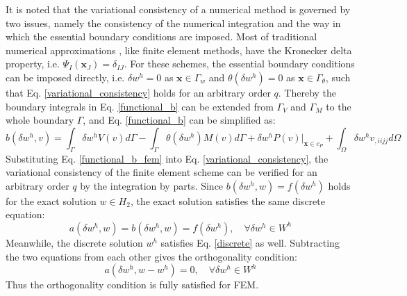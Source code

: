 It is noted that the variational consistency of a numerical method is governed by two issues, namely the consistency of the numerical integration and the way in which the essential boundary conditions are imposed.
Most of traditional numerical approximations \cite{}, like finite element methods, have the Kronecker delta property, i.e. $\Psi_I(\boldsymbol x_J) = \delta_{IJ}$.
For these schemes, the essential boundary conditions can be imposed directly, i.e. $\delta w^h=0$ as $\boldsymbol x \in \Gamma_w$ and $\theta(\delta w^h)=0$ as $\boldsymbol x \in \Gamma_{\theta}$, such that Eq. \eqref{variational_consistency} holds for an arbitrary order $q$.
Thereby the boundary integrals in Eq. \eqref{functional_b} can be extended from $\Gamma_{V}$ and $\Gamma_{M}$ to the whole boundary $\Gamma$, and Eq. \eqref{functional_b} can be simplified as:
\begin{equation}\label{functional_b_fem}
	b(\delta w^h, v) =
	\int_{\Gamma} \delta w^h V(v) d\Gamma
	- \int_{\Gamma} \theta(\delta w^h) M(v) d\Gamma
	+ \delta w^h P(v)\vert_{\boldsymbol x \in c_P}
	+ \int_\Omega \delta w^h v_{,iijj} d\Omega
\end{equation}
Substituting Eq. \eqref{functional_b_fem} into Eq. \eqref{variational_consistency}, the variational consistency of the finite element scheme can be verified for an arbitrary order $q$ by the integration by parts.
Since $b(\delta w^h, w)=f(\delta w^h)$ holds for the exact solution $w\in H_2$, the exact solution satisfies the same discrete equation:
\begin{equation}\label{weakform_residual}
	a(\delta w^h, w) = b(\delta w^h, w) = f(\delta w^h), \quad \forall \delta w^h \in W^h
\end{equation}
Meanwhile, the discrete solution $w^h$ satisfies Eq. \eqref{discrete} as well.
Subtracting the two equations from each other gives the orthogonality condition:
\begin{equation}\label{orthogonality}
	a(\delta w^h, w - w^h) = 0, \quad \forall \delta w^h \in W^h
\end{equation}
Thus the orthogonality condition is fully satisfied for FEM.


